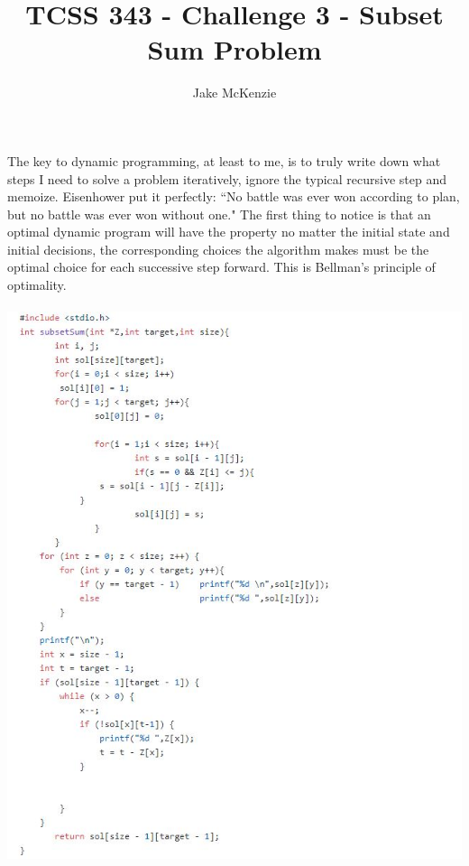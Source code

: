 \documentclass[12pt]{article}
\begin{document}
\title{TCSS 343 - Challenge 3 - Subset Sum Problem}
\author{Jake McKenzie}
\maketitle
\noindent The key to dynamic programming, at least to me, is to truly write down what steps I need to solve a problem iteratively, ignore the typical recursive step and memoize. Eisenhower put it perfectly: ``No battle was ever won according to plan, but no battle was ever won without one." The first thing to notice is that an optimal dynamic program will have the property no matter the initial state and initial decisions, the corresponding choices the algorithm makes must be the optimal choice for each successive step forward. This is Bellman's principle of optimality.\\\\
\noindent \includegraphics{code1.jpg}\\
\end{document}

